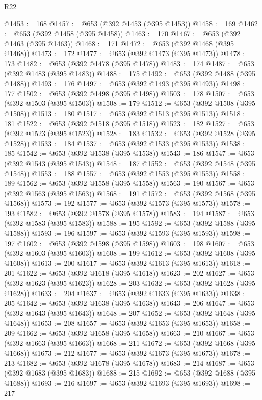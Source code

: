 \begin{lexlean}{R22}
\begin{coremodule}
@1453 := 168
@1457 := @653 (@392 @1453 (@395 @1453))
@1458 := 169
@1462 := @653 (@392 @1458 (@395 @1458))
@1463 := 170
@1467 := @653 (@392 @1463 (@395 @1463))
@1468 := 171
@1472 := @653 (@392 @1468 (@395 @1468))
@1473 := 172
@1477 := @653 (@392 @1473 (@395 @1473))
@1478 := 173
@1482 := @653 (@392 @1478 (@395 @1478))
@1483 := 174
@1487 := @653 (@392 @1483 (@395 @1483))
@1488 := 175
@1492 := @653 (@392 @1488 (@395 @1488))
@1493 := 176
@1497 := @653 (@392 @1493 (@395 @1493))
@1498 := 177
@1502 := @653 (@392 @1498 (@395 @1498))
@1503 := 178
@1507 := @653 (@392 @1503 (@395 @1503))
@1508 := 179
@1512 := @653 (@392 @1508 (@395 @1508))
@1513 := 180
@1517 := @653 (@392 @1513 (@395 @1513))
@1518 := 181
@1522 := @653 (@392 @1518 (@395 @1518))
@1523 := 182
@1527 := @653 (@392 @1523 (@395 @1523))
@1528 := 183
@1532 := @653 (@392 @1528 (@395 @1528))
@1533 := 184
@1537 := @653 (@392 @1533 (@395 @1533))
@1538 := 185
@1542 := @653 (@392 @1538 (@395 @1538))
@1543 := 186
@1547 := @653 (@392 @1543 (@395 @1543))
@1548 := 187
@1552 := @653 (@392 @1548 (@395 @1548))
@1553 := 188
@1557 := @653 (@392 @1553 (@395 @1553))
@1558 := 189
@1562 := @653 (@392 @1558 (@395 @1558))
@1563 := 190
@1567 := @653 (@392 @1563 (@395 @1563))
@1568 := 191
@1572 := @653 (@392 @1568 (@395 @1568))
@1573 := 192
@1577 := @653 (@392 @1573 (@395 @1573))
@1578 := 193
@1582 := @653 (@392 @1578 (@395 @1578))
@1583 := 194
@1587 := @653 (@392 @1583 (@395 @1583))
@1588 := 195
@1592 := @653 (@392 @1588 (@395 @1588))
@1593 := 196
@1597 := @653 (@392 @1593 (@395 @1593))
@1598 := 197
@1602 := @653 (@392 @1598 (@395 @1598))
@1603 := 198
@1607 := @653 (@392 @1603 (@395 @1603))
@1608 := 199
@1612 := @653 (@392 @1608 (@395 @1608))
@1613 := 200
@1617 := @653 (@392 @1613 (@395 @1613))
@1618 := 201
@1622 := @653 (@392 @1618 (@395 @1618))
@1623 := 202
@1627 := @653 (@392 @1623 (@395 @1623))
@1628 := 203
@1632 := @653 (@392 @1628 (@395 @1628))
@1633 := 204
@1637 := @653 (@392 @1633 (@395 @1633))
@1638 := 205
@1642 := @653 (@392 @1638 (@395 @1638))
@1643 := 206
@1647 := @653 (@392 @1643 (@395 @1643))
@1648 := 207
@1652 := @653 (@392 @1648 (@395 @1648))
@1653 := 208
@1657 := @653 (@392 @1653 (@395 @1653))
@1658 := 209
@1662 := @653 (@392 @1658 (@395 @1658))
@1663 := 210
@1667 := @653 (@392 @1663 (@395 @1663))
@1668 := 211
@1672 := @653 (@392 @1668 (@395 @1668))
@1673 := 212
@1677 := @653 (@392 @1673 (@395 @1673))
@1678 := 213
@1682 := @653 (@392 @1678 (@395 @1678))
@1683 := 214
@1687 := @653 (@392 @1683 (@395 @1683))
@1688 := 215
@1692 := @653 (@392 @1688 (@395 @1688))
@1693 := 216
@1697 := @653 (@392 @1693 (@395 @1693))
@1698 := 217

\end{coremodule}
\end{lexlean}
